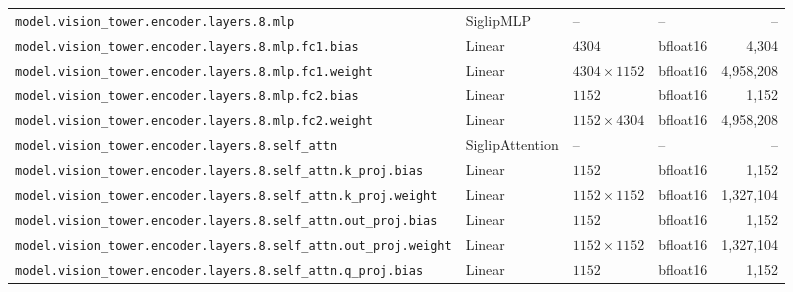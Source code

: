 \documentclass[10pt,a4paper]{article}
\theoremstyle{definition}
\begin{document}
\begin{appendices}
{\begin{longtable}{p{6.8cm}>{\raggedright\arraybackslash}p{3.3cm}llr}
\texttt{model.\allowbreak{}vision\_tower.\allowbreak{}encoder.\allowbreak{}layers.\allowbreak{}8.\allowbreak{}mlp} & Siglip\allowbreak{}MLP & -- & -- & -- \\
\texttt{model.\allowbreak{}vision\_tower.\allowbreak{}encoder.\allowbreak{}layers.\allowbreak{}8.\allowbreak{}mlp.\allowbreak{}fc1.\allowbreak{}bias} & Linear & $4304$ & bfloat16 & 4,304 \\
\texttt{model.\allowbreak{}vision\_tower.\allowbreak{}encoder.\allowbreak{}layers.\allowbreak{}8.\allowbreak{}mlp.\allowbreak{}fc1.\allowbreak{}weight} & Linear & $4304 \times 1152$ & bfloat16 & 4,958,208 \\
\texttt{model.\allowbreak{}vision\_tower.\allowbreak{}encoder.\allowbreak{}layers.\allowbreak{}8.\allowbreak{}mlp.\allowbreak{}fc2.\allowbreak{}bias} & Linear & $1152$ & bfloat16 & 1,152 \\
\texttt{model.\allowbreak{}vision\_tower.\allowbreak{}encoder.\allowbreak{}layers.\allowbreak{}8.\allowbreak{}mlp.\allowbreak{}fc2.\allowbreak{}weight} & Linear & $1152 \times 4304$ & bfloat16 & 4,958,208 \\
\texttt{model.\allowbreak{}vision\_tower.\allowbreak{}encoder.\allowbreak{}layers.\allowbreak{}8.\allowbreak{}self\_attn} & Siglip\allowbreak{}Attention & -- & -- & -- \\
\texttt{model.\allowbreak{}vision\_tower.\allowbreak{}encoder.\allowbreak{}layers.\allowbreak{}8.\allowbreak{}self\_attn.\allowbreak{}k\_proj.\allowbreak{}bias} & Linear & $1152$ & bfloat16 & 1,152 \\
\texttt{model.\allowbreak{}vision\_tower.\allowbreak{}encoder.\allowbreak{}layers.\allowbreak{}8.\allowbreak{}self\_attn.\allowbreak{}k\_proj.\allowbreak{}weight} & Linear & $1152 \times 1152$ & bfloat16 & 1,327,104 \\
\texttt{model.\allowbreak{}vision\_tower.\allowbreak{}encoder.\allowbreak{}layers.\allowbreak{}8.\allowbreak{}self\_attn.\allowbreak{}out\_proj.\allowbreak{}bias} & Linear & $1152$ & bfloat16 & 1,152 \\
\texttt{model.\allowbreak{}vision\_tower.\allowbreak{}encoder.\allowbreak{}layers.\allowbreak{}8.\allowbreak{}self\_attn.\allowbreak{}out\_proj.\allowbreak{}weight} & Linear & $1152 \times 1152$ & bfloat16 & 1,327,104 \\
\texttt{model.\allowbreak{}vision\_tower.\allowbreak{}encoder.\allowbreak{}layers.\allowbreak{}8.\allowbreak{}self\_attn.\allowbreak{}q\_proj.\allowbreak{}bias} & Linear & $1152$ & bfloat16 & 1,152 \\

\end{longtable}}
\end{appendices}
\end{document}
